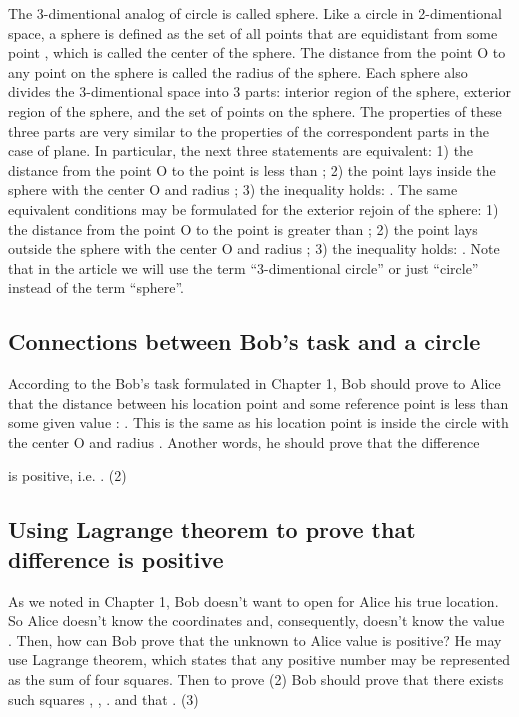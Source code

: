 \documentclass{article}
\begin{document}
The 3-dimentional analog of circle is called sphere. Like a circle in 2-dimentional space,
a sphere is defined as the set of all points that are equidistant from some point     , which is called the center of the sphere.
The distance from the point O to any point      on the sphere is called the radius of the sphere.
Each sphere also divides the 3-dimentional space into 3 parts: interior region of the sphere, exterior region of the sphere, and the set of points on the sphere.
The properties of these three parts are very similar to the properties of the correspondent parts in the case of plane.
In particular, the next three statements are equivalent:
1) the distance      from the point O to the point      is less than     ;
2) the point      lays inside the sphere with the center O and radius     ;
3) the inequality holds:
    .
The same equivalent conditions may be formulated for the exterior rejoin of the sphere:
1) the distance      from the point O to the point      is greater than     ;
2) the point      lays outside the sphere with the center O and radius     ;
3) the inequality holds:
    .
Note that in the article we will use the term “3-dimentional circle” or just “circle” instead of the term “sphere”.

\subsection{Connections between Bob’s task and a circle}  %
According to the Bob’s task formulated in Chapter 1,
Bob should prove to Alice that the distance between his location point   
and some reference point      is less than some given value     :
    .
This is the same as his location point      is inside the circle with the center O and radius     .
Another words, he should prove that the difference
    
is positive, i.e.
    .                                    (2)

\subsection{Using Lagrange theorem to prove that difference is positive}  %
As we noted in Chapter 1, Bob doesn’t want to open for Alice his true location.
So Alice doesn’t know the coordinates      and, consequently, doesn’t know the value
    .
Then, how can Bob prove that the unknown to Alice value is positive?
He may use Lagrange theorem, which states that any positive number may be represented as the sum of four squares.
Then to prove (2) Bob should prove that there exists such squares     ,     ,     . and      that
    .                     (3)
\end{document}
